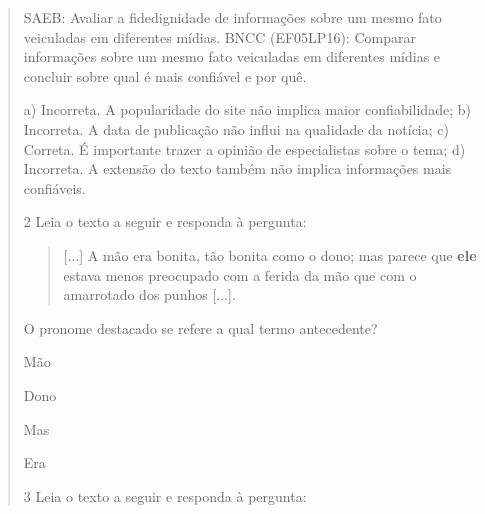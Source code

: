 \begin{quote}
{SAEB: Avaliar a fidedignidade de informações sobre um mesmo fato
veiculadas em diferentes mídias. BNCC (EF05LP16): Comparar informações
sobre um mesmo fato veiculadas em diferentes mídias e concluir sobre
qual é mais confiável e por quê.

a) Incorreta. A popularidade do site não implica maior confiabilidade;
b) Incorreta. A data de publicação não influi na qualidade da notícia;
c) Correta. É importante trazer a opinião de especialistas sobre o tema;
d) Incorreta. A extensão do texto também não implica informações mais
confiáveis.}

\num{2} Leia o texto a seguir e responda à pergunta:

\begin{quote}
{[}...{]} A mão era bonita, tão bonita como o dono; mas parece que
\textbf{ele} estava menos preocupado com a ferida da mão que com o
amarrotado dos punhos {[}...{]}.

\end{quote}

O pronome destacado se refere a qual termo antecedente?

\begin{escolha}
\item Mão

\item Dono

\item Mas

\item Era
\end{escolha}


\num{3} Leia o texto a seguir e responda à pergunta:


\end{quote}
